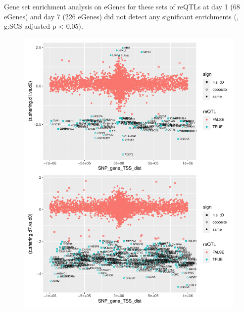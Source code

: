 Gene set enrichment analysis on eGenes for these sets of \glspl{reQTL} at day 1 (68 eGenes) and day 7 (226 eGenes) did not detect any significant enrichments (, g:SCS adjusted p < 0.05).

%

%

\begin{figure}
    \centering
    \includegraphics[width=1.0\textwidth]{mainmatter/figures/chapter_03/compare_dge_eqtl.z_sharing.vs.SNP_gene_TSS_dist.pdf}
    \caption{}
    \label{fig:hird_eQTL_zSharing_vs_TSSdist_mega}
\end{figure}

